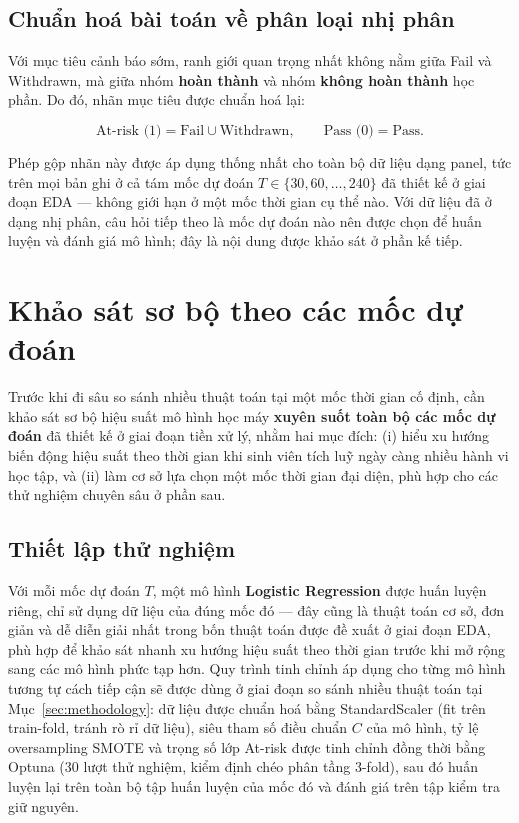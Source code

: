 \documentclass[a4paper]{article}
\newcommand{\code}[1]{{\ttfamily\def\_{\textunderscore\discretionary{}{}{}}#1}}
\def\code#1{#1}%
\def\_{ }%
\begin{document}
\subsection{Chuẩn hoá bài toán về phân loại nhị phân}

Với mục tiêu cảnh báo sớm, ranh giới quan trọng nhất không nằm giữa Fail và
Withdrawn, mà giữa nhóm \textbf{hoàn thành} và nhóm \textbf{không hoàn thành}
học phần. Do đó, nhãn mục tiêu được chuẩn hoá lại:

\[
  \text{At-risk (1)} = \text{Fail} \cup \text{Withdrawn}, \qquad
  \text{Pass (0)} = \text{Pass}.
\]

Phép gộp nhãn này được áp dụng thống nhất cho toàn bộ dữ liệu dạng panel, tức
trên mọi bản ghi ở cả tám mốc dự đoán $T \in \{30, 60, \ldots, 240\}$ đã thiết
kế ở giai đoạn EDA --- không giới hạn ở một mốc thời gian cụ thể nào. Với dữ
liệu đã ở dạng nhị phân, câu hỏi tiếp theo là mốc dự đoán nào nên được chọn để
huấn luyện và đánh giá mô hình; đây là nội dung được khảo sát ở phần kế tiếp.

\section{Khảo sát sơ bộ theo các mốc dự đoán}
\label{sec:snapshot_survey}

Trước khi đi sâu so sánh nhiều thuật toán tại một mốc thời gian cố định, cần
khảo sát sơ bộ hiệu suất mô hình học máy \textbf{xuyên suốt toàn bộ các mốc dự
đoán} đã thiết kế ở giai đoạn tiền xử lý, nhằm hai mục đích: (i) hiểu xu hướng
biến động hiệu suất theo thời gian khi sinh viên tích luỹ ngày càng nhiều hành
vi học tập, và (ii) làm cơ sở lựa chọn một mốc thời gian đại diện, phù hợp cho
các thử nghiệm chuyên sâu ở phần sau.

\subsection{Thiết lập thử nghiệm}

Với mỗi mốc dự đoán $T$, một mô hình \textbf{Logistic Regression} được huấn
luyện riêng, chỉ sử dụng dữ liệu của đúng mốc đó --- đây cũng là thuật toán cơ
sở, đơn giản và dễ diễn giải nhất trong bốn thuật toán được đề xuất ở giai
đoạn EDA, phù hợp để khảo sát nhanh xu hướng hiệu suất theo thời gian trước
khi mở rộng sang các mô hình phức tạp hơn. Quy trình tinh chỉnh áp dụng cho
từng mô hình tương tự cách tiếp cận sẽ được dùng ở giai đoạn so sánh nhiều
thuật toán tại Mục~\ref{sec:methodology}: dữ liệu được chuẩn hoá bằng
\code{StandardScaler} (fit trên train-fold, tránh rò rỉ dữ liệu), siêu tham số
điều chuẩn $C$ của mô hình, tỷ lệ oversampling SMOTE và trọng số lớp At-risk
được tinh chỉnh đồng thời bằng Optuna (30 lượt thử nghiệm, kiểm định chéo phân
tầng 3-fold), sau đó huấn luyện lại trên toàn bộ tập huấn luyện của mốc đó và
đánh giá trên tập kiểm tra giữ nguyên.
\end{document}
